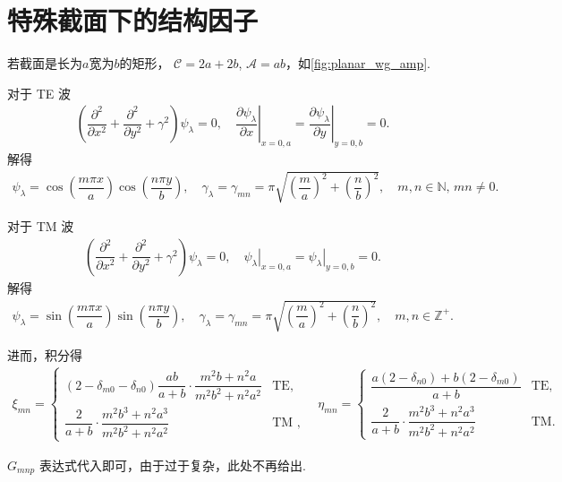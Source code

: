\section{特殊截面下的结构因子}
\begin{exbox}
	若截面是长为\(a\)宽为\(b\)的矩形， \(\mathcal{C} = 2a + 2b\), \(\mathcal{A} = ab\)，如\cref{fig:planar_wg_amp}.

	对于 TE 波
	\begin{align*}
		\left( \dfrac{\partial^2}{\partial x^2} + \dfrac{\partial^2}{\partial y^2} + \gamma^2 \right) \psi_\lambda = 0, \quad \left. \dfrac{\partial \psi_\lambda}{\partial x} \right|_{x=0,a} = \left. \dfrac{\partial \psi_\lambda}{\partial y} \right|_{y=0,b} = 0.
	\end{align*}
	解得
	\begin{align*}
		\psi_\lambda = \cos\left( \dfrac{m\pi x}{a} \right) \cos\left( \dfrac{n\pi y}{b} \right), \quad \gamma_\lambda = \gamma_{mn} = \pi \sqrt{\left( \dfrac{m}{a} \right)^2 + \left( \dfrac{n}{b} \right)^2}, \quad m, n\in \mathbb{N},\,mn\neq0.
	\end{align*}

	对于 TM 波
	\begin{align*}
		\left( \dfrac{\partial^2}{\partial x^2} + \dfrac{\partial^2}{\partial y^2} + \gamma^2 \right) \psi_\lambda = 0, \quad \left. \psi_\lambda \right|_{x=0,a} = \left. \psi_\lambda \right|_{y=0,b} = 0.
	\end{align*}
	解得
	\begin{align*}
		\psi_\lambda = \sin\left( \dfrac{m\pi x}{a} \right) \sin\left( \dfrac{n\pi y}{b} \right), \quad \gamma_\lambda = \gamma_{mn} = \pi \sqrt{\left( \dfrac{m}{a} \right)^2 + \left( \dfrac{n}{b} \right)^2}, \quad m, n \in \mathbb{Z}^+.
	\end{align*}

	进而，积分得
	\begin{align*}
		\xi_{mn} =
		\begin{cases}
			\left( 2 - \delta_{m0} - \delta_{n0} \right) \dfrac{ab}{a + b} \cdot \dfrac{m^2 b + n^2 a}{m^2 b^2 + n^2 a^2} & \text{TE},  \\[8pt]
			\dfrac{2}{a + b} \cdot \dfrac{m^2 b^3 + n^2 a^3}{m^2 b^2 + n^2 a^2}                                           & \text{TM },
		\end{cases}
		\quad
		\eta_{mn} =
		\begin{cases}
			\dfrac{a \left( 2 - \delta_{n0} \right) + b \left( 2 - \delta_{m0} \right)}{a + b} & \text{TE}, \\[8pt]
			\dfrac{2}{a + b} \cdot \dfrac{m^2 b^3 + n^2 a^3}{m^2 b^2 + n^2 a^2}                & \text{TM}.
		\end{cases}
	\end{align*}

	\(G_{mnp}\) 表达式代入即可，由于过于复杂，此处不再给出.
\end{exbox}

